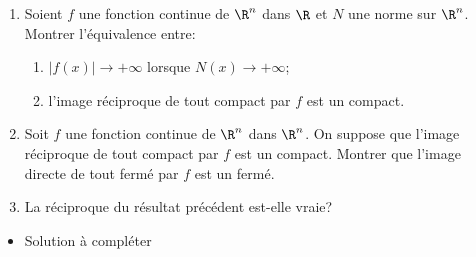 \begin{enonce}
\begin{exercise}[ID={RMS134 E672},subtitle={Mines-Ponts MP 2023},theme={analyse},annee={2023},concours={mines-ponts},filiere={MP}, difficulty={0}]
  \begin{enumerate}
  \item Soient $f$ une fonction continue de $\R^n$ dans $\R$ et $N$
    une norme sur $\R^n$. Montrer l'équivalence entre:
    \begin{enumerate}
    \item $|f(x)|\to +\infty$ lorsque $N(x)\to +\infty$;
    \item l'image réciproque de tout compact par $f$ est un compact.
    \end{enumerate}
  \item Soit $f$ une fonction continue de $\R^n$ dans $\R^n$. On
    suppose que l'image réciproque de tout compact par $f$ est un
    compact. Montrer que l'image directe de tout fermé par $f$ est un
    fermé.
  \item La réciproque du résultat précédent est-elle vraie?
  \end{enumerate}
\end{exercise}
\begin{solution}
  \begin{itemize}
    \item Solution à compléter
  \end{itemize}
\end{solution}
\end{enonce}